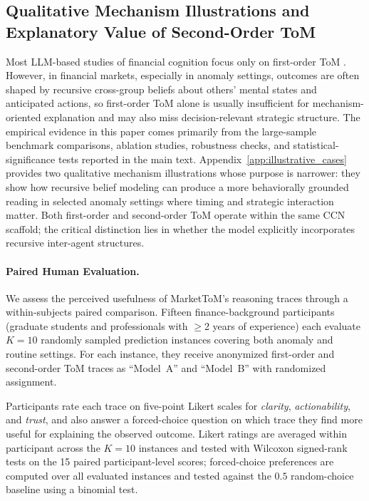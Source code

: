 \documentclass[a4paper,fleqn,doubleblind]{cas-sc}
\begin{document}
\subsection{Qualitative Mechanism Illustrations and Explanatory Value of Second-Order ToM}
\label{sec:validating_cognitive_complexity}
Most LLM-based studies of financial cognition focus only on first-order ToM \citep{yuzhe2025twinmarket,wang2024llmfactor,li2024causalstock}. However, in financial markets, especially in anomaly settings, outcomes are often shaped by recursive cross-group beliefs about others' mental states and anticipated actions, so first-order ToM alone is usually insufficient for mechanism-oriented explanation and may also miss decision-relevant strategic structure. The empirical evidence in this paper comes primarily from the large-sample benchmark comparisons, ablation studies, robustness checks, and statistical-significance tests reported in the main text. Appendix~\ref{app:illustrative_cases} provides two qualitative mechanism illustrations whose purpose is narrower: they show how recursive belief modeling can produce a more behaviorally grounded reading in selected anomaly settings where timing and strategic interaction matter. Both first-order and second-order ToM operate within the same CCN scaffold; the critical distinction lies in whether the model explicitly incorporates recursive inter-agent structures.

\paragraph{Paired Human Evaluation.}
We assess the perceived usefulness of MarketToM's reasoning traces through a within-subjects paired comparison. Fifteen finance-background participants (graduate students and professionals with $\geq$2 years of experience) each evaluate $K=10$ randomly sampled prediction instances covering both anomaly and routine settings. For each instance, they receive anonymized first-order and second-order ToM traces as ``Model~A'' and ``Model~B'' with randomized assignment.

Participants rate each trace on five-point Likert scales for \emph{clarity}, \emph{actionability}, and \emph{trust}, and also answer a forced-choice question on which trace they find more useful for explaining the observed outcome. Likert ratings are averaged within participant across the $K=10$ instances and tested with Wilcoxon signed-rank tests on the 15 paired participant-level scores; forced-choice preferences are computed over all evaluated instances and tested against the $0.5$ random-choice baseline using a binomial test.
\end{document}
